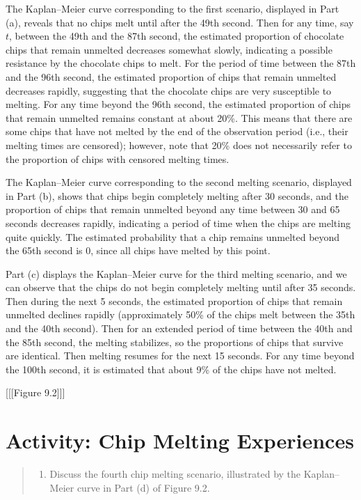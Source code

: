 \documentclass[
]{report}
\providecommand{\tightlist}{%
  \setlength{\itemsep}{0pt}\setlength{\parskip}{0pt}}
\begin{document}
The Kaplan--Meier curve corresponding to the first scenario, displayed in Part (a), reveals that no chips melt until after the 49th second. Then for any time, say \(t\), between the 49th and the 87th second, the estimated proportion of chocolate chips that remain unmelted decreases somewhat slowly, indicating a possible resistance by the chocolate chips to melt. For the period of time between the 87th and the 96th second, the estimated proportion of chips that remain unmelted decreases rapidly, suggesting that the chocolate chips are very susceptible to melting. For any time beyond the 96th second, the estimated proportion of chips that remain unmelted remains constant at about 20\%. This means that there are some chips that have not melted by the end of the observation period (i.e., their melting times are censored); however, note that 20\% does not necessarily refer to the proportion of chips with censored melting times.

The Kaplan--Meier curve corresponding to the second melting scenario, displayed in Part (b), shows that chips begin completely melting after 30 seconds, and the proportion of chips that remain unmelted beyond any time between 30 and 65 seconds decreases rapidly, indicating a period of time when the chips are melting quite quickly. The estimated probability that a chip remains unmelted beyond the 65th second is 0, since all chips have melted by this point.

Part (c) displays the Kaplan--Meier curve for the third melting scenario, and we can observe that the chips do not begin completely melting until after 35 seconds. Then during the next 5 seconds, the estimated proportion of chips that remain unmelted declines rapidly (approximately 50\% of the chips melt between the 35th and the 40th second). Then for an extended period of time between the 40th and the 85th second, the melting stabilizes, so the proportions of chips that survive are identical. Then melting resumes for the next 15 seconds. For any time beyond the 100th second, it is estimated that about 9\% of the chips have not melted.

{[}{[}{[}Figure 9.2{]}{]}{]}

\section*{Activity: Chip Melting Experiences}\label{activity-chip-melting-experiences}

\begin{quote}
\begin{enumerate}
\def\labelenumi{\arabic{enumi}.}
\setcounter{enumi}{19}
\tightlist
\item
  Discuss the fourth chip melting scenario, illustrated by the Kaplan--Meier curve in Part (d) of Figure 9.2.
\end{enumerate}
\end{quote}
\end{document}
